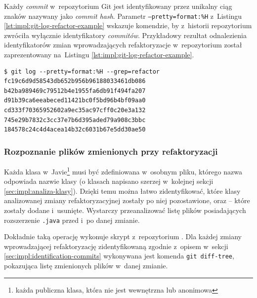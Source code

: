 \documentclass[twoside]{praca}
\begin{document}
Każdy \textit{commit} w~repozytorium Git jest identyfikowany przez unikalny ciąg znaków nazywany jako \textit{commit hash}. Parametr \texttt{--pretty=format:\%H} z~Listingu \ref{lst:impl:git-log-refactor-example} wskazuje komendzie, by z~historii repozytorium zwróciła wyłącznie identyfikatory \textit{commitów}. Przykładowy rezultat odnalezienia identyfikatorów zmian wprowadzających refaktoryzacje w~repozytorium został zaprezentowany na~Listingu \ref{lst:impl:git-log-refactor-example}.

\begin{lstlisting}[frame=single,caption={Przykłaodowy rezultat wyszukania w~repozytorium zmian z~zadanym słowem kluczowym w~\textit{commit message}},captionpos=b,label={lst:impl:git-log-refactor-example}]
$ git log --pretty=format:%H --grep=refactor
fc19c6d9d58543db652b956b96188033461db086
b42ba989469c79512b4e1955fa6db91f494fa207
d91b39ca6eeabeced11421bc0f5bd96b4bf09aa0
cd333f70365952602a9ec35ac97cff0c20e3a132
745e29b7832c3cc37e7b6d395aded79a908c3bbc
184578c24c4d4acea14b32c6031b67e5dd30ae50
\end{lstlisting}

\subsubsection{Rozpoznanie plików zmienionych przy refaktoryzacji}
Każda klasa w~Javie\footnote{każda publiczna klasa, która nie jest wewnętrzna lub anonimowa} musi być zdefiniowana w~osobnym pliku, którego nazwa odpowiada nazwie klasy (o klasach napisano szerzej w~kolejnej sekcji \ref{sec:impl:analiza-klasy}). Dzięki temu można łatwo zidentyfikować, które klasy analizowanej zmiany refaktoryzacyjnej zostały po niej pozostawione, oraz -- które zostały dodane i~usunięte. Wystarczy przeanalizować listę plików posiadających rozszerzenie \texttt{.java} przed i~po danej zmianie.

Dokładnie taką operację wykonuje skrypt  z~repozytorium \cite{fracz:refactor-extractor}. Dla każdej zmiany wprowadzającej refaktoryzację zidentyfikowaną zgodnie z~opisem w~sekcji \ref{sec:impl:identification-commits} wykonywana jest komenda \texttt{git diff-tree}, pokazująca listę zmienionych plików w~danej zmianie.

\end{document}
